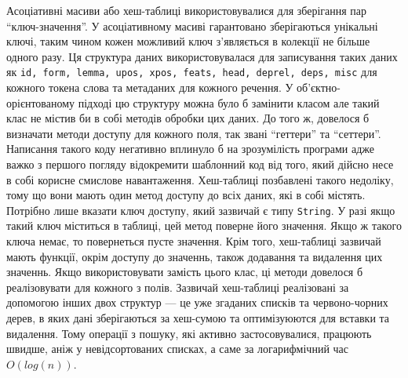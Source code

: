 Асоціативні масиви або хеш-таблиці використовувалися для зберігання пар ``ключ-значення''.
У асоціативному масиві гарантовано зберігаються унікальні ключі, таким чином кожен 
можливий ключ з’являється в колекції не більше одного разу. Ця структура даних
використовувалася для записування таких даних як \texttt{id, form, lemma, upos, xpos,
feats, head, deprel, deps, misc} для кожного токена слова та метаданих для кожного
речення. У об'єктно-орієнтованому підході цю структуру
можна було б замінити класом але такий клас не містив би в собі
методів обробки цих даних. До того ж, довелося б визначати методи доступу для кожного
поля, так звані ``геттери'' та ``сеттери''. Написання такого коду негативно
вплинуло б на зрозумілість програми адже важко з першого погляду відокремити
шаблонний код від того, який дійсно несе в собі корисне смислове навантаження.
Хеш-таблиці позбавлені такого недоліку, тому що вони мають один метод доступу
до всіх даних, які в собі містять. Потрібно лише вказати ключ доступу, який зазвичай
є типу \texttt{String}. У разі якщо такий ключ міститься в таблиці, цей метод поверне
його значення. Якщо ж такого ключа немає, то повернеться пусте значення. Крім того,
хеш-таблиці зазвичай мають функції, окрім доступу до значеннь, також додавання
та видалення цих значеннь. Якщо використовувати замість цього клас, ці методи довелося б
реалізовувати для кожного з полів. Зазвичай хеш-таблиці реалізовані за допомогою
інших двох структур --- це уже згаданих списків та червоно-чорних дерев, в яких дані
зберігаються за хеш-сумою та оптимізуюются для вставки та видалення. Тому операції
з пошуку, які активно застосовувалися, працюють швидше, аніж у невідсортованих
списках, а саме за логарифмічний час $O(log(n))$.

